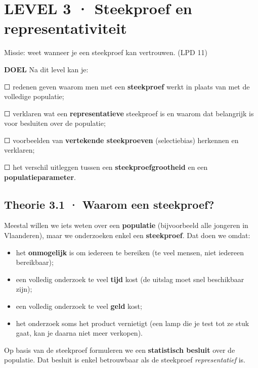 \section{LEVEL 3 · Steekproef en representativiteit}

\begin{missie}
Missie: weet wanneer je een steekproef kan vertrouwen. (LPD 11)
\end{missie}

\begin{doel}
\textbf{DOEL} \quad Na dit level kan je:

☐ redenen geven waarom men met een \textbf{steekproef} werkt in plaats van met de volledige populatie;

☐ verklaren wat een \textbf{representatieve} steekproef is en waarom dat belangrijk is voor besluiten over de populatie;

☐ voorbeelden van \textbf{vertekende steekproeven} (selectiebias) herkennen en verklaren;

☐ het verschil uitleggen tussen een \textbf{steekproefgrootheid} en een \textbf{populatieparameter}.
\end{doel}

\subsection*{Theorie 3.1 · Waarom een steekproef?}

\begin{theorie}
Meestal willen we iets weten over een \textbf{populatie} (bijvoorbeeld alle jongeren in Vlaanderen), maar we onderzoeken enkel een \textbf{steekproef}. Dat doen we omdat:

\begin{itemize}
\item het \textbf{onmogelijk} is om iedereen te bereiken (te veel mensen, niet iedereen bereikbaar);
\item een volledig onderzoek te veel \textbf{tijd} kost (de uitslag moet snel beschikbaar zijn);
\item een volledig onderzoek te veel \textbf{geld} kost;
\item het onderzoek soms het product vernietigt (een lamp die je test tot ze stuk gaat, kan je daarna niet meer verkopen).
\end{itemize}

Op basis van de steekproef formuleren we een \textbf{statistisch besluit} over de populatie. Dat besluit is enkel betrouwbaar als de steekproef \emph{representatief} is.
\end{theorie}

